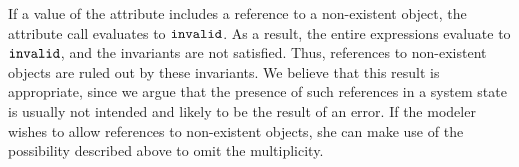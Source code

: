 If a value of the attribute  includes a reference to a non-existent
object, the attribute call evaluates to $\mathtt{invalid}$. As a result, the
entire expressions evaluate to $\mathtt{invalid}$, and the invariants are not
satisfied. Thus, references to non-existent objects are ruled out by these
invariants. We believe that this result is appropriate, since we argue that the
presence of such references in a system state is usually not intended and likely
to be the result of an error. If the modeler wishes to allow references to
non-existent objects, she can make use of the possibility described above to
omit the multiplicity.





